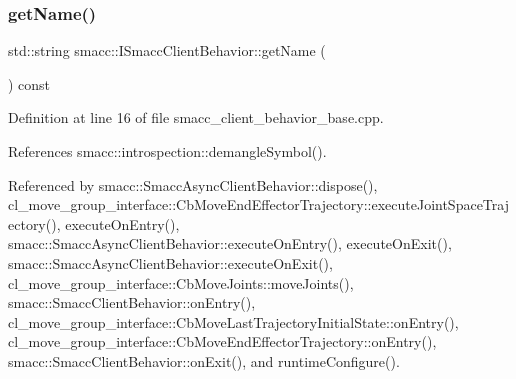 \subsubsection{\texorpdfstring{get\+Name()}{getName()}}
{\footnotesize\ttfamily std\+::string smacc\+::\+I\+Smacc\+Client\+Behavior\+::get\+Name (\begin{DoxyParamCaption}{ }\end{DoxyParamCaption}) const}



Definition at line 16 of file smacc\+\_\+client\+\_\+behavior\+\_\+base.\+cpp.



References smacc\+::introspection\+::demangle\+Symbol().



Referenced by smacc\+::\+Smacc\+Async\+Client\+Behavior\+::dispose(), cl\+\_\+move\+\_\+group\+\_\+interface\+::\+Cb\+Move\+End\+Effector\+Trajectory\+::execute\+Joint\+Space\+Trajectory(), execute\+On\+Entry(), smacc\+::\+Smacc\+Async\+Client\+Behavior\+::execute\+On\+Entry(), execute\+On\+Exit(), smacc\+::\+Smacc\+Async\+Client\+Behavior\+::execute\+On\+Exit(), cl\+\_\+move\+\_\+group\+\_\+interface\+::\+Cb\+Move\+Joints\+::move\+Joints(), smacc\+::\+Smacc\+Client\+Behavior\+::on\+Entry(), cl\+\_\+move\+\_\+group\+\_\+interface\+::\+Cb\+Move\+Last\+Trajectory\+Initial\+State\+::on\+Entry(), cl\+\_\+move\+\_\+group\+\_\+interface\+::\+Cb\+Move\+End\+Effector\+Trajectory\+::on\+Entry(), smacc\+::\+Smacc\+Client\+Behavior\+::on\+Exit(), and runtime\+Configure().


